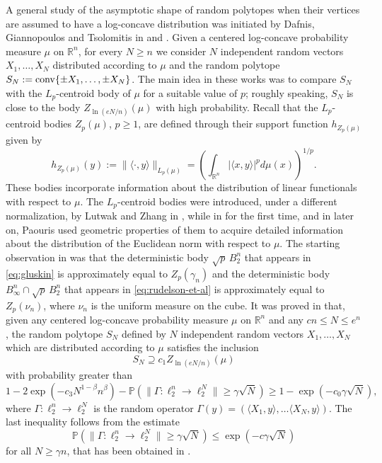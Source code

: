 \documentclass[11pt,leqno]{article}
\theoremstyle{definition}
\theoremstyle{remark}
\numberwithin{equation}{section}
\newcommand{\ls}{\leqslant}
\newcommand{\gr}{\geqslant}
\newcommand{\1}{\textbf{1}}
\begin{document}
A general study of the asymptotic shape of random polytopes when their vertices are assumed to have a log-concave
distribution was initiated by Dafnis, Giannopoulos and Tsolomitis in \cite{DGT1} and \cite{DGT2}.
Given a centered log-concave probability measure $\mu $ on
${\mathbb R}^n$, for every $N\gr n$ we consider $N$ independent random vectors $X_1,\ldots ,X_N$ distributed according to
$\mu $ and the random polytope $S_N:={\rm conv}\{ \pm X_1,\ldots ,\pm X_N\}$.
The main idea in these works was to compare $S_N$ with the $L_p$-centroid body of $\mu $
for a suitable value of $p$; roughly speaking, $S_N$ is close to the body $Z_{\ln (eN/n)}(\mu )$
with high probability.  Recall that the $L_p$-centroid bodies $Z_p(\mu)$, $p\gr 1$, are defined
through their support function $h_{Z_p(\mu)}$ given by
\begin{equation}
h_{Z_p(\mu)}(y):= \|\langle \cdot ,y\rangle \|_{L_p(\mu)} = \left(\int_{{\mathbb R}^n}|\langle x,y\rangle|^pd\mu(x)\right)^{1/p}.
\end{equation}
These bodies incorporate information about the distribution of linear functionals
with respect to $\mu$. The $L_p$-centroid bodies were introduced, under a different normalization,
by Lutwak and Zhang in \cite{Lutwak-Zhang-1997}, while in \cite{Paouris-2006} for the first time,
and in \cite{Paouris-2012} later on, Paouris used geometric properties
of them to acquire detailed information about the distribution of the Euclidean norm with
respect to $\mu $. The starting observation in \cite{DGT1} was that the deterministic body
$\sqrt{p}\,B_2^n$ that appears in \eqref{eq:gluskin} is approximately equal to $Z_p(\gamma_n)$ and
the deterministic body $B_{\infty}^n\cap \sqrt{p}\,B_2^n$ that appears in \eqref{eq:rudelson-et-al} is approximately
equal to $Z_p(\nu_n)$, where $\nu_n$ is the uniform measure on the cube.
It was proved in \cite{DGT1} that, given any centered log-concave probability measure $\mu $
on ${\mathbb R}^n$ and any $cn\ls N\ls e^n$, the random polytope $S_N$ defined by $N$ independent random vectors
$X_1,\ldots ,X_N$ which are distributed according to $\mu $ satisfies the inclusion
\begin{equation}\label{eq:DGT}S_N\supseteq c_1Z_{\ln (eN/n)}(\mu )\end{equation}
with probability greater than
\begin{equation*}1-2\exp\left (-c_3N^{1-\beta }n^{\beta }\right
)-{\mathbb P}(\|\Gamma :\ell_2^n\to\ell_2^N\|\gr \gamma\sqrt{N}) \gr
1-\exp (-c_0\gamma\sqrt{N}),\end{equation*} where
$\Gamma:\ell_2^n\to\ell_2^N$ is the random operator
$\Gamma(y)=(\langle X_1, y\rangle, \ldots \langle X_N, y\rangle)$. The last inequality follows from the estimate
\begin{equation*}{\mathbb P}(\|\Gamma :\ell_2^n\to\ell_2^N\|\gr \gamma
\sqrt{N})\ls\exp (-c\gamma\sqrt{N})\end{equation*} for all $N\gr
\gamma n$, that has been obtained in \cite{ALPT}.
\end{document}

